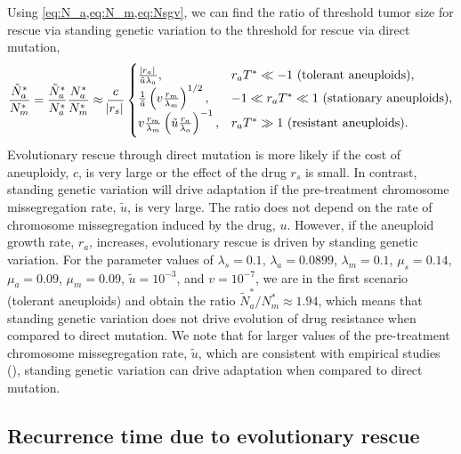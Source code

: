 \documentclass[12pt]{extarticle}
\renewcommand{\Delta}{r}
\begin{document}
Using \cref{eq:N_a,eq:N_m,eq:Nsgv}, we can find the ratio of threshold tumor size for rescue via standing genetic variation  to the threshold for rescue via direct mutation,
\begin{equation} \label{eq:N_sgv_ratio}
\frac{\tilde{N}^*_a}{N^*_m}=\frac{\tilde{N}^*_{a}}{N^*_{a}} \frac{N^*_a}{N^*_m} \approx \frac{c}{\abs{\Delta_s}}\begin{cases}
    \frac{\abs{\Delta_a}}{\tilde{u}\lambda_a} ,&
  \Delta_a T^* \ll -1 \text{ (tolerant aneuploids)} ,\\ 
  \frac{1}{\tilde{u}}\left(v \frac{\Delta_m}{\lambda_m}\right)^{1/2} ,&
  -1 \ll \Delta_a T^* \ll 1 \text{ (stationary aneuploids)} ,\\ 
  v \frac{\Delta_m}{\lambda_m} \left(\tilde{u}\frac{\Delta_a}{\lambda_a}\right)^{-1}  ,&
   \Delta_a T^* \gg 1\text{ (resistant aneuploids)} .
  \end{cases}
\end{equation}
Evolutionary rescue through direct mutation is more likely if the cost of aneuploidy, $c$, is very large or the effect of the drug $\Delta_s$ is small. In contrast, standing genetic variation will drive adaptation if the pre-treatment chromosome missegregation rate, $\tilde{u}$, is very large. The ratio does not depend on the rate of chromosome missegregation induced by the drug, $u$. However, if the aneuploid growth rate, $\Delta_a$, increases, evolutionary rescue is driven by standing genetic variation. For the parameter values of  $\lambda_s=0.1$, $\lambda_a=0.0899$, $\lambda_m=0.1$, $\mu_s=0.14$, $\mu_a=0.09$, $\mu_m=0.09$, $\tilde{u}=10^{-3}$, and $v=10^{-7}$, we are in the first scenario (tolerant aneuploids) and obtain the ratio $\tilde{N}^*_a/N^*_m \approx 1.94$, which means that standing genetic variation does not drive evolution of drug resistance when compared to direct mutation. We note that for larger values of the pre-treatment chromosome missegregation rate, $\tilde{u}$, which are consistent with empirical studies (), standing genetic variation can drive adaptation when compared to direct mutation.


\subsection*{Recurrence time due to evolutionary rescue}
\end{document}
